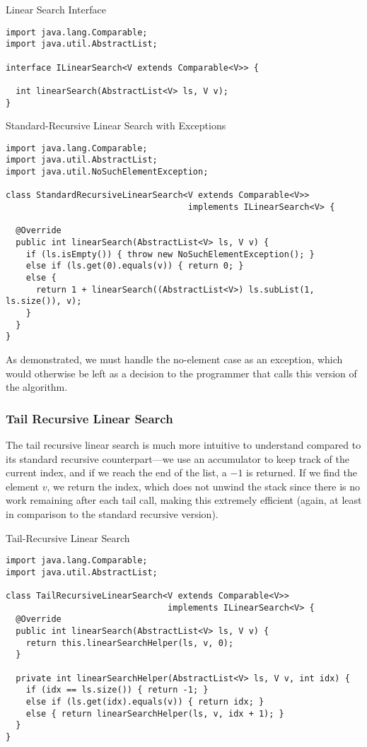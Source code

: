 \begin{cl}[]{Linear Search Interface}
\begin{lstlisting}[language=MyJava]
import java.lang.Comparable;
import java.util.AbstractList;

interface ILinearSearch<V extends Comparable<V>> {
  
  int linearSearch(AbstractList<V> ls, V v);
}
\end{lstlisting}
\end{cl}

\begin{cl}[]{Standard-Recursive Linear Search with Exceptions}
\begin{lstlisting}[language=MyJava]
import java.lang.Comparable;
import java.util.AbstractList;
import java.util.NoSuchElementException;
  
class StandardRecursiveLinearSearch<V extends Comparable<V>> 
                                    implements ILinearSearch<V> {
  
  @Override
  public int linearSearch(AbstractList<V> ls, V v) {
    if (ls.isEmpty()) { throw new NoSuchElementException(); }
    else if (ls.get(0).equals(v)) { return 0; }
    else { 
      return 1 + linearSearch((AbstractList<V>) ls.subList(1, ls.size()), v); 
    }
  }
}
\end{lstlisting}
\end{cl}

As demonstrated, we must handle the no-element case as an exception, which would otherwise be left as a decision to the programmer that calls this version of the  algorithm.

\subsubsection*{Tail Recursive Linear Search}

The tail recursive linear search is much more intuitive to understand compared to its standard recursive counterpart---we use an accumulator to keep track of the current index, and if we reach the end of the list, a $-1$ is returned. If we find the element $v$, we return the index, which does not unwind the stack since there is no work remaining after each tail call, making this extremely efficient (again, at least in comparison to the standard recursive version).

\begin{cl}[]{Tail-Recursive Linear Search}
\begin{lstlisting}[language=MyJava]
import java.lang.Comparable;
import java.util.AbstractList;

class TailRecursiveLinearSearch<V extends Comparable<V>> 
                                implements ILinearSearch<V> {
  @Override
  public int linearSearch(AbstractList<V> ls, V v) {
    return this.linearSearchHelper(ls, v, 0);
  }

  private int linearSearchHelper(AbstractList<V> ls, V v, int idx) {
    if (idx == ls.size()) { return -1; }
    else if (ls.get(idx).equals(v)) { return idx; }
    else { return linearSearchHelper(ls, v, idx + 1); }
  }
}
\end{lstlisting}
\end{cl}

